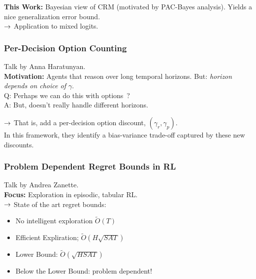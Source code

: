 {\bf This Work:} Bayesian view of CRM (motivated by PAC-Bayes analysis). Yields a nice generalization error bound. \\

$\rightarrow$ Application to mixed logits.

\spacerule

\subsubsection{Per-Decision Option Counting~\cite{harutyunyan2019per}}

Talk by Anna Haratunyan. \\

{\bf Motivation:} Agents that reason over long temporal horizons. But: {\it horizon depends on choice of $\gamma$}. \\

Q: Perhaps we can do this with options~\cite{sutton1999between}? \\

A: But, doesn't really handle different horizons. \\


$\rightarrow$ That is, add a per-decision option discount, $(\gamma_r, \gamma_p)$. \\

In this framework, they identify a bias-variance trade-off captured by these new discounts.

\spacerule

\subsubsection{Problem Dependent Regret Bounds in RL~\cite{zanette2019tighter}}

Talk by Andrea Zanette. \\

{\bf Focus:} Exploration in episodic, tabular RL. \\

$\rightarrow$ State of the art regret bounds:
\begin{itemize}
    \item No intelligent exploration $\tilde{O}(T)$
    \item Efficient Expliration; $\tilde{O}(H\sqrt{SAT})$
    \item Lower Bound: $\tilde{O}(\sqrt{HSAT})$
    \item Below the Lower Bound: problem dependent!
\end{itemize}

